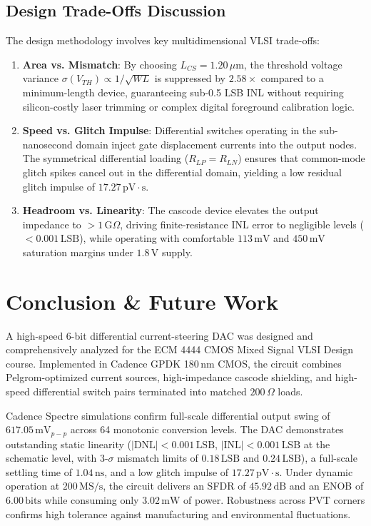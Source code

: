 \documentclass[conference,10pt]{IEEEtran}
\begin{document}
\subsection{Design Trade-Offs Discussion}
The design methodology involves key multidimensional VLSI trade-offs:
\begin{enumerate}
    \item \textbf{Area vs. Mismatch}: By choosing $L_{CS} = 1.20\,\mu\text{m}$, the threshold voltage variance $\sigma(V_{TH}) \propto 1/\sqrt{WL}$ is suppressed by $2.58\times$ compared to a minimum-length device, guaranteeing sub-0.5 LSB INL without requiring silicon-costly laser trimming or complex digital foreground calibration logic.
    \item \textbf{Speed vs. Glitch Impulse}: Differential switches operating in the sub-nanosecond domain inject gate displacement currents into the output nodes. The symmetrical differential loading ($R_{LP} = R_{LN}$) ensures that common-mode glitch spikes cancel out in the differential domain, yielding a low residual glitch impulse of $17.27\,\text{pV}\cdot\text{s}$.
    \item \textbf{Headroom vs. Linearity}: The cascode device elevates the output impedance to $>1\,\text{G}\Omega$, driving finite-resistance INL error to negligible levels ($<0.001\,\text{LSB}$), while operating with comfortable $113\,\text{mV}$ and $450\,\text{mV}$ saturation margins under $1.8\,\text{V}$ supply.
\end{enumerate}

\section{Conclusion \& Future Work}
A high-speed 6-bit differential current-steering DAC was designed and comprehensively analyzed for the ECM 4444 CMOS Mixed Signal VLSI Design course. Implemented in Cadence GPDK 180\,nm CMOS, the circuit combines Pelgrom-optimized current sources, high-impedance cascode shielding, and high-speed differential switch pairs terminated into matched $200\,\Omega$ loads. 

Cadence Spectre simulations confirm full-scale differential output swing of $617.05\,\text{mV}_{p-p}$ across 64 monotonic conversion levels. The DAC demonstrates outstanding static linearity ($|\text{DNL}| < 0.001\,\text{LSB}$, $|\text{INL}| < 0.001\,\text{LSB}$ at the schematic level, with 3-$\sigma$ mismatch limits of $0.18\,\text{LSB}$ and $0.24\,\text{LSB}$), a full-scale settling time of $1.04\,\text{ns}$, and a low glitch impulse of $17.27\,\text{pV}\cdot\text{s}$. Under dynamic operation at $200\,\text{MS/s}$, the circuit delivers an SFDR of $45.92\,\text{dB}$ and an ENOB of $6.00\,\text{bits}$ while consuming only $3.02\,\text{mW}$ of power. Robustness across PVT corners confirms high tolerance against manufacturing and environmental fluctuations.
\end{document}
